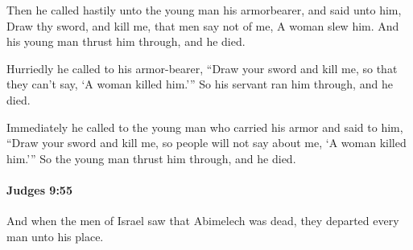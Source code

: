 			\begin{versebox}
					\item[BHS] 
					\item[ASV] Then he called hastily unto the young man his armorbearer, and said unto him, Draw thy sword, and kill me, that men say not of me, A woman slew him. And his young man thrust him through, and he died.
					\item[NIV] Hurriedly he called to his armor-bearer, “Draw your sword and kill me, so that they can’t say, ‘A woman killed him.’” So his servant ran him through, and he died.
					\item[NRSV] Immediately he called to the young man who carried his armor and said to him, “Draw your sword and kill me, so people will not say about me, ‘A woman killed him.’” So the young man thrust him through, and he died.
			\end{versebox}

		\paragraph{Judges 9:55} %
			\label{JUDGES-9-55}

			And when the men of Israel saw that Abimelech was dead, they departed every man unto his place.

